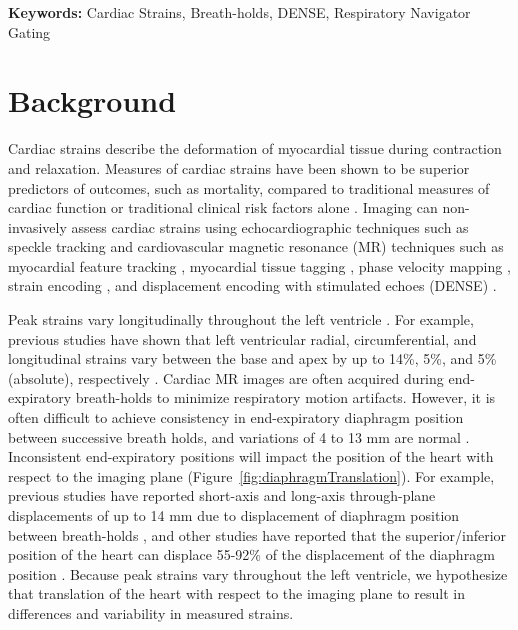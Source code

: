	\noindent \textbf{Keywords:} Cardiac Strains, Breath-holds, DENSE, Respiratory Navigator Gating
	
\newpage

\section{Background}
	Cardiac strains describe the deformation of myocardial tissue during contraction and relaxation. Measures of cardiac strains have been shown to be superior predictors of outcomes, such as mortality, compared to traditional measures of cardiac function or traditional clinical risk factors alone \cite{Stanton2009}. Imaging can non-invasively assess cardiac strains using echocardiographic techniques such as speckle tracking \cite{Amundsen2006} and cardiovascular magnetic resonance (MR) techniques such as myocardial feature tracking \cite{Hor2010}, myocardial tissue tagging \cite{Axel1989,Zerhouni1988}, phase velocity mapping \cite{Pelc1994}, strain encoding \cite{Osman2001}, and displacement encoding with stimulated echoes (DENSE) \cite{Aletras1999b,Aletras1999c}.

	Peak strains vary longitudinally throughout the left ventricle \cite{Kuijer2002,Moore2000,Young1994a,Feng2009,NasiraeiMoghaddam2010,Donekal2013a,Suever2017}. For example, previous studies have shown that left ventricular radial, circumferential, and longitudinal strains vary between the base and apex by up to 14\%, 5\%, and 5\% (absolute), respectively \cite{Kuijer2002,Moore2000,Young1994a,Feng2009,NasiraeiMoghaddam2010,Donekal2013a,Suever2017}. Cardiac MR images are often acquired during end-expiratory breath-holds to minimize respiratory motion artifacts. However, it is often difficult to achieve consistency in end-expiratory diaphragm position between successive breath holds, and variations of 4 to 13 mm are normal \cite{Liu1993,Wang1995a,Taylor1997a,Holland1998c,Fischer2006a}. Inconsistent end-expiratory positions will impact the position of the heart with respect to the imaging plane (Figure~\ref{fig:diaphragmTranslation}). For example, previous studies have reported short-axis and long-axis through-plane displacements of up to 14 mm due to displacement of diaphragm position between breath-holds \cite{Slomka2007,Swingen2003}, and other studies have reported that the superior/inferior position of the heart can displace 55-92\% of the displacement of the diaphragm position \cite{Wang1995b,McLeish2002}. Because peak strains vary throughout the left ventricle, we hypothesize that translation of the heart with respect to the imaging plane to result in differences and variability in measured strains.

